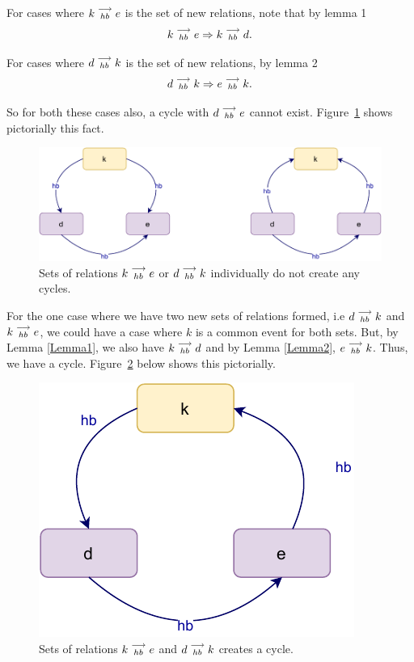     For cases where $k\stackrel{\longrightarrow}{_{hb}}e$ is the set of new relations, note that by lemma 1
    \[
        k\stackrel{\longrightarrow}{_{hb}}e \Rightarrow k\stackrel{\longrightarrow}{_{hb}}d.
    \]

    For cases where $d\stackrel{\longrightarrow}{_{hb}}k$ is the set of new relations, by lemma 2
    \[
        d\stackrel{\longrightarrow}{_{hb}}k \Rightarrow e\stackrel{\longrightarrow}{_{hb}}k.
    \]

    So for both these cases also, a cycle with $d\stackrel{\longrightarrow}{_{hb}}e$ cannot exist. 
    Figure~\ref{reord:cycle(b)} shows pictorially this fact. 
    \begin{figure}[H]
        \centering
        \includegraphics[scale=0.7]{4.InstructionReordering/4.ValidReorderingCandidate/ProofParts/Part3/part3(c).pdf}
        \caption{Sets of relations $k\stackrel{\longrightarrow}{_{hb}}e$ or $d\stackrel{\longrightarrow}{_{hb}}k$ individually do not create any cycles.}
        \label{reord:cycle(b)}
    \end{figure}

    For the one case where we have two new sets of relations formed, i.e $d\stackrel{\longrightarrow}{_{hb}}k$ and $k\stackrel{\longrightarrow}{_{hb}}e$, we could have a case where $k$ is a common event for both sets. 
    But, by Lemma \ref{Lemma1}, we also have $k\stackrel{\longrightarrow}{_{hb}}d$ and by Lemma \ref{Lemma2}, $e\stackrel{\longrightarrow}{_{hb}}k$\footnotemark. 
    Thus, we have a cycle. 
    Figure~\ref{reord:cycle(c)} below shows this pictorially.
    \begin{figure}[H]
        \centering
        \includegraphics[scale=0.7]{4.InstructionReordering/4.ValidReorderingCandidate/ProofParts/Part3/part3(d).pdf}
        \caption{Sets of relations $k\stackrel{\longrightarrow}{_{hb}}e$ and $d\stackrel{\longrightarrow}{_{hb}}k$ creates a cycle.}
        \label{reord:cycle(c)}
    \end{figure}

